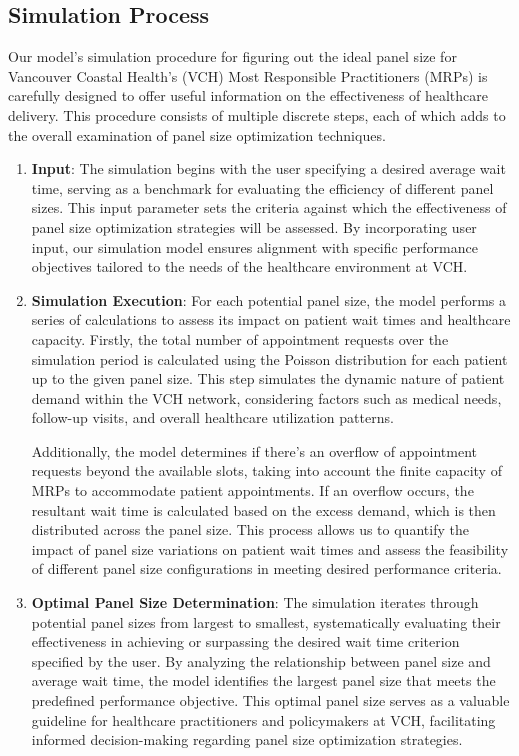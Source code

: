 \documentclass[11pt]{article}
\theoremstyle{definition}
\begin{document}
\subsection*{Simulation Process} Our model's simulation procedure for figuring out the ideal panel size for Vancouver Coastal Health's (VCH) Most Responsible Practitioners (MRPs) is carefully designed to offer useful information on the effectiveness of healthcare delivery. This procedure consists of multiple discrete steps, each of which adds to the overall examination of panel size optimization techniques.
\begin{enumerate}
    \item \textbf{Input}: The simulation begins with the user specifying a desired average wait time, serving as a benchmark for evaluating the efficiency of different panel sizes. This input parameter sets the criteria against which the effectiveness of panel size optimization strategies will be assessed. By incorporating user input, our simulation model ensures alignment with specific performance objectives tailored to the needs of the healthcare environment at VCH.
    \item \textbf{Simulation Execution}: For each potential panel size, the model performs a series of calculations to assess its impact on patient wait times and healthcare capacity. Firstly, the total number of appointment requests over the simulation period is calculated using the Poisson distribution for each patient up to the given panel size. This step simulates the dynamic nature of patient demand within the VCH network, considering factors such as medical needs, follow-up visits, and overall healthcare utilization patterns.
    
    Additionally, the model determines if there's an overflow of appointment requests beyond the available slots, taking into account the finite capacity of MRPs to accommodate patient appointments. If an overflow occurs, the resultant wait time is calculated based on the excess demand, which is then distributed across the panel size. This process allows us to quantify the impact of panel size variations on patient wait times and assess the feasibility of different panel size configurations in meeting desired performance criteria. \cite{Lee2013}
    \item \textbf{Optimal Panel Size Determination}: The simulation iterates through potential panel sizes from largest to smallest, systematically evaluating their effectiveness in achieving or surpassing the desired wait time criterion specified by the user. By analyzing the relationship between panel size and average wait time, the model identifies the largest panel size that meets the predefined performance objective. This optimal panel size serves as a valuable guideline for healthcare practitioners and policymakers at VCH, facilitating informed decision-making regarding panel size optimization strategies. \cite{Apaydin2020}
\end{enumerate}
\end{document}
